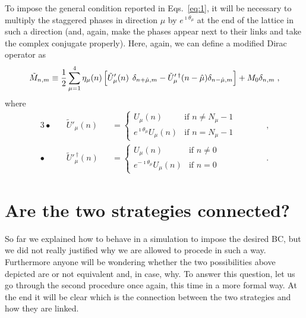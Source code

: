 \documentclass[a4paper,10pt]{article}
\newcommand{\Eqs}[1]{Eqs.~\eqref{eq:#1}}
\begin{document}
\smallskip

To impose the general condition reported in \Eqs{1}, it will be necessary to multiply the
staggered phases in direction $\mu$ by $e^{\imath\theta_\mu}$ at the end of the lattice
in such a direction (and, again, make the phases appear next to their links and take
the complex conjugate properly). Here, again, we can define a modified Dirac operator as
\begin{equation*}
 \tilde{M}_{n,m}\equiv\frac{1}{2}\sum_{\mu=1}^4\eta_\mu(n)\,\Bigl[
                      \tilde{U}'_\mu(n)^{\phantom{\dag}}\delta_{n+\hat\mu,m}-
                      \tilde{U}'^{\:\dag}_\mu(n-\hat\mu)\delta_{n-\hat\mu,m}\Bigr]+M_0\delta_{n,m}\;,
\end{equation*}
where
\begin{alignat*}{3}
 \bullet& \quad\tilde{U}'_\mu(n)&&=\begin{cases} U_\mu(n) &\text{if }n\neq N_\mu-1 \\
                                 e^{\imath\theta_\mu} U_\mu(n) &\text{if }n=N_\mu-1 \end{cases} \qquad&&,\\[1ex]
 \bullet& \quad\tilde{U}'^{\:\dag}_\mu(n)&&=\begin{cases} U_\mu(n) &\text{if }n\neq 0 \\
                                 e^{-\imath\theta_\mu} U_\mu(n) &\text{if }n=0 \end{cases}&&.
\end{alignat*}


\section*{Are the two strategies connected?}

So far we explained how to behave in a simulation to impose the desired BC, but we did not
really justified why we are allowed to procede in such a way. Furthermore anyone will be
wondering whether the two possibilities above depicted are or not equivalent and, in case, why.
To answer this question, let us go through the second procedure once again, this time in a
more formal way. At the end it will be clear which is the connection between the two strategies
and how they are linked.

\medskip
\end{document}
